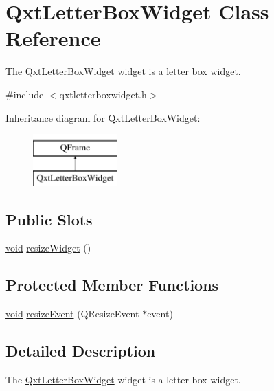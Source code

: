 \hypertarget{class_qxt_letter_box_widget}{\section{Qxt\-Letter\-Box\-Widget Class Reference}
\label{class_qxt_letter_box_widget}
}


The \hyperlink{class_qxt_letter_box_widget}{Qxt\-Letter\-Box\-Widget} widget is a letter box widget.  




{\ttfamily \#include $<$qxtletterboxwidget.\-h$>$}

Inheritance diagram for Qxt\-Letter\-Box\-Widget\-:\begin{figure}[H]
\begin{center}
\leavevmode
\includegraphics[height=2.000000cm]{class_qxt_letter_box_widget}
\end{center}
\end{figure}
\subsection*{Public Slots}
\begin{DoxyCompactItemize}
\item 
\hyperlink{group___u_a_v_objects_plugin_ga444cf2ff3f0ecbe028adce838d373f5c}{void} \hyperlink{class_qxt_letter_box_widget_a5d7336b89543cf6942f6e69cdd516708}{resize\-Widget} ()
\end{DoxyCompactItemize}
\subsection*{Protected Member Functions}
\begin{DoxyCompactItemize}
\item 
\hyperlink{group___u_a_v_objects_plugin_ga444cf2ff3f0ecbe028adce838d373f5c}{void} \hyperlink{class_qxt_letter_box_widget_af85874ca055dece897bd318c9de86215}{resize\-Event} (Q\-Resize\-Event $\ast$event)
\end{DoxyCompactItemize}


\subsection{Detailed Description}
The \hyperlink{class_qxt_letter_box_widget}{Qxt\-Letter\-Box\-Widget} widget is a letter box widget. 

